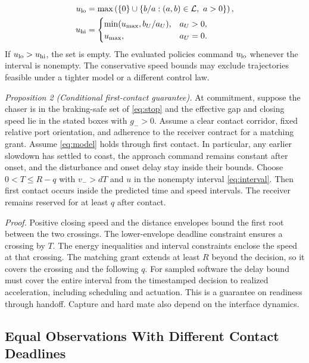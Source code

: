 \documentclass{IEEEtaes}
\begin{document}
\begin{equation}
\begin{aligned}
u_{\rm lo}&=\max\left(\{0\}\cup\{b/a:(a,b)\in\mathcal L,\ a>0\}\right),\\
u_{\rm hi}&=
\begin{cases}
\min(u_{\max},b_U/a_U), & a_U>0,\\
u_{\max}, & a_U=0.
\end{cases}
\end{aligned}
\label{eq:interval}
\end{equation}
If $u_{\rm lo}>u_{\rm hi}$, the set is empty. The evaluated policies command $u_{\rm lo}$ whenever the interval is nonempty. The conservative speed bounds may exclude trajectories feasible under a tighter model or a different control law.

\emph{Proposition 2 (Conditional first-contact guarantee).} At commitment, suppose the chaser is in the braking-safe set of \eqref{eq:stop} and the effective gap and closing speed lie in the stated boxes with $g_->0$. Assume a clear contact corridor, fixed relative port orientation, and adherence to the receiver contract for a matching grant. Assume \eqref{eq:model} holds through first contact. In particular, any earlier slowdown has settled to coast, the approach command remains constant after onset, and the disturbance and onset delay stay inside their bounds. Choose $0<T\le R-q$ with $v_->dT$ and $u$ in the nonempty interval \eqref{eq:interval}. Then first contact occurs inside the predicted time and speed intervals. The receiver remains reserved for at least $q$ after contact.

\emph{Proof.} Positive closing speed and the distance envelopes bound the first root between the two crossings. The lower-envelope deadline constraint ensures a crossing by $T$. The energy inequalities and interval constraints enclose the speed at that crossing. The matching grant extends at least $R$ beyond the decision, so it covers the crossing and the following $q$. For sampled software the delay bound must cover the entire interval from the timestamped decision to realized acceleration, including scheduling and actuation. This is a guarantee on readiness through handoff. Capture and hard mate also depend on the interface dynamics.

\subsection{Equal Observations With Different Contact Deadlines}
\label{sec:example}
\end{document}
